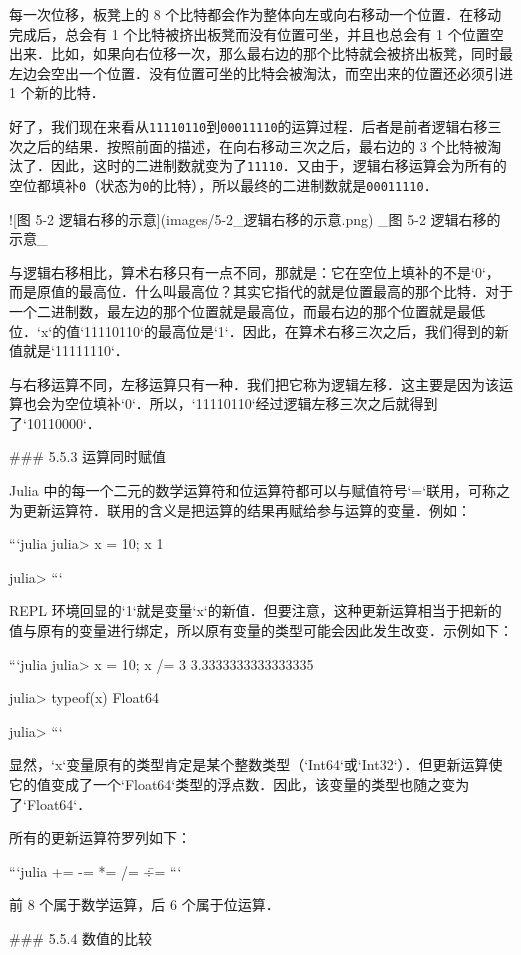 每一次位移，板凳上的 8 个比特都会作为整体向左或向右移动一个位置．在移动完成后，总会有 1 个比特被挤出板凳而没有位置可坐，并且也总会有 1 个位置空出来．比如，如果向右位移一次，那么最右边的那个比特就会被挤出板凳，同时最左边会空出一个位置．没有位置可坐的比特会被淘汰，而空出来的位置还必须引进 1 个新的比特．

好了，我们现在来看从\verb|11110110|到\verb|00011110|的运算过程．后者是前者逻辑右移三次之后的结果．按照前面的描述，在向右移动三次之后，最右边的 3 个比特被淘汰了．因此，这时的二进制数就变为了\verb|11110|．又由于，逻辑右移运算会为所有的空位都填补\verb|0|（状态为\verb|0|的比特），所以最终的二进制数就是\verb|00011110|．

![图 5-2 逻辑右移的示意](images/5-2_逻辑右移的示意.png)
_图 5-2 逻辑右移的示意_

与逻辑右移相比，算术右移只有一点不同，那就是：它在空位上填补的不是`0`，而是原值的最高位．什么叫最高位？其实它指代的就是位置最高的那个比特．对于一个二进制数，最左边的那个位置就是最高位，而最右边的那个位置就是最低位．`x`的值`11110110`的最高位是`1`．因此，在算术右移三次之后，我们得到的新值就是`11111110`．

与右移运算不同，左移运算只有一种．我们把它称为逻辑左移．这主要是因为该运算也会为空位填补`0`．所以，`11110110`经过逻辑左移三次之后就得到了`10110000`．

### 5.5.3 运算同时赋值

Julia 中的每一个二元的数学运算符和位运算符都可以与赋值符号`=`联用，可称之为更新运算符．联用的含义是把运算的结果再赋给参与运算的变量．例如：

```julia
julia> x = 10; x %
1

julia>
```

REPL 环境回显的`1`就是变量`x`的新值．但要注意，这种更新运算相当于把新的值与原有的变量进行绑定，所以原有变量的类型可能会因此发生改变．示例如下：

```julia
julia> x = 10; x /= 3
3.3333333333333335

julia> typeof(x)
Float64

julia> 
```

显然，`x`变量原有的类型肯定是某个整数类型（`Int64`或`Int32`）．但更新运算使它的值变成了一个`Float64`类型的浮点数．因此，该变量的类型也随之变为了`Float64`．

所有的更新运算符罗列如下：

```julia
+= -= *= /= \= ÷= %
```

前 8 个属于数学运算，后 6 个属于位运算．

### 5.5.4 数值的比较

